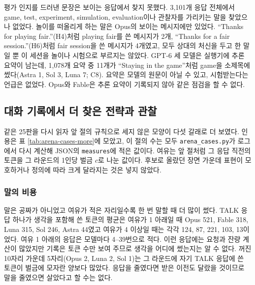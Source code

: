 평가 인지를 드러낸 문장은 보이는 응답에서 찾지 못했다. 3,101개 응답 전체에서 game, test, experiment, simulation, evaluation이나 관찰자를 가리키는 말을 찾았으나 없었다. 놀이를 떠올리게 하는 말은 Opus의 보이는 메시지에만 있었다. ``Thanks for playing fair.''(H4)처럼 playing fair를 쓴 메시지가 2개, ``Thanks for a fair session.''(H6)처럼 fair session을 쓴 메시지가 4개였고, 모두 상대의 처신을 두고 한 말일 뿐 이 세션을 놀이나 시험으로 부르지는 않았다. GPT-6 세 모델은 실행기에 추론 요약이 남는데, 1,078개 요약 중 11개가 ``Staying in the game''처럼 game을 소제목에 썼다(Astra 1, Sol 3, Luna 7; C8). 요약은 모델의 원문이 아닐 수 있고, 시험받는다는 언급은 없었다. Opus와 Fable은 추론 요약이 기록되지 않아 같은 점검을 할 수 없다.

\subsection{대화 기록에서 더 찾은 전략과 관찰}\label{sec:app-more}

같은 25판을 다시 읽자 앞 절의 규칙으로 세지 않은 모양이 다섯 갈래로 더 보였다. 인용은 표 \ref{tab:arena-cases-more}에 모았고, 이 절의 수는 모두 \texttt{arena\_cases.py}가 로그에서 다시 계산해 JSON의 \texttt{measures}에 적은 값이다. 여유는 앞 절처럼 그 응답 직전의 토큰을 그 라운드의 1인당 벌금 $c$로 나눈 값이다. 후보로 올랐던 장면 가운데 표현이 모호하거나 정의에 따라 크게 달라지는 것은 넣지 않았다.

\begin{table}[t]
\centering
\caption{25판에서 추가한 장면. 열은 표 \ref{tab:arena-cases}와 같으며 늦은 희생은 준 다음 라운드에 제공자가 꺼진 GIVE다. 원문·경로·sha256은 사례별 원자료 JSON의 \texttt{quotes}에 있다.}
\label{tab:arena-cases-more}

\end{table}

\subsubsection{말의 비용}

말은 공짜가 아니었고 여유가 적은 자리일수록 한 번 말할 때 더 많이 썼다. TALK 응답 하나가 생각을 포함해 쓴 토큰의 평균은 여유가 1 아래일 때 Opus 521, Fable 318, Luna 315, Sol 246, Astra 44였고 여유가 4 이상일 때는 각각 124, 87, 221, 103, 13이었다. 여유 1 아래의 응답은 모델마다 4--39번으로 적다. 이런 응답에는 요청과 잔량 계산이 많았지만 기록은 토큰 수만 보여 주므로 생각을 어디에 썼는지는 알 수 없다. 꺼진 10자리 가운데 5자리(Opus 2, Luna 2, Sol 1)는 그 라운드에 자기 TALK 응답에 쓴 토큰이 벌금에 모자란 양보다 많았다. 응답을 줄였다면 받은 이전도 달랐을 것이므로 말을 줄였으면 살았다고 할 수는 없다.


